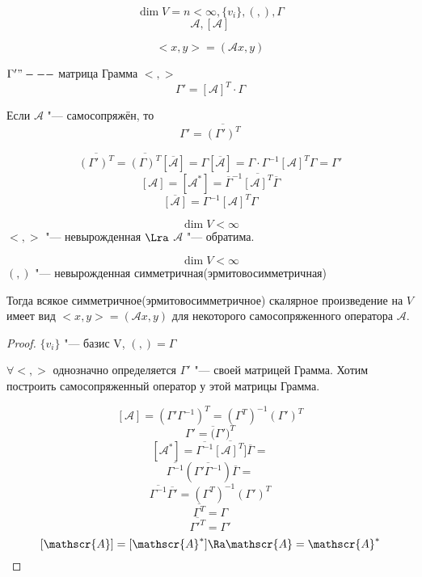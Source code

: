 \begin{exmp}
$$\dim V = n < \infty, \{v_i\}, (,), \Gamma$$
$$\mathscr{A}, [\mathscr{A}]$$

$$<x, y> = (\mathscr{A}x, y)$$

$\Gamma' "---$ матрица Грамма $<, >$
$$\Gamma' = [\mathscr{A}]^{T}\cdot \Gamma$$

Если $\mathscr{A}$ "--- самосопряжён, то
$$\Gamma' = \overline{(\Gamma')^{T}} $$

$$\overline{(\Gamma')^{T}} = \overline{(\Gamma)^{T}}[\overline{\mathscr{A}}] = \Gamma[\overline{\mathscr{A}}] = \Gamma \cdot \Gamma^{-1}[\mathscr{A}]^{T}\Gamma = \Gamma'$$
$$[\mathscr{A}] = [\mathscr{A}^*] = \overline{\Gamma}^{-1} \overline{[\mathscr{A}]^{T}} \overline{\Gamma}$$
$$\overline{[\mathscr{A}]} = \Gamma^{-1}[\mathscr{A}]^{T}\Gamma $$
\end{exmp}

\begin{conseq}{}
$$ \dim V < \infty$$
$<,>$ "--- невырожденная $\Lra$ $\mathscr{A}$ "--- обратима. 
\end{conseq}

\begin{conseq}{}
$$\dim V < \infty $$
$(,)$ "--- невырожденная симметричная(эрмитовосимметричная)

Тогда всякое симметричное(эрмитовосимметричное) скалярное произведение на $V$ имеет вид
$<x, y> = (\mathscr{A}x, y) $ для некоторого самосопряженного оператора $\mathscr{A}$.

\end{conseq}
\begin{proof}
$\{v_i\}$ "--- базис V, $(,) = \Gamma$

$\forall <, >$ однозначно определяется $\Gamma'$ "--- своей матрицей Грамма. Хотим построить самосопряженный оператор у этой матрицы Грамма.  

$$[\mathscr{A}] = (\Gamma' \Gamma^{-1})^{T} = (\Gamma^{T})^{-1}(\Gamma')^{T}$$
$$\Gamma' = \overline(\Gamma')^{T}$$
$$[\mathscr{A}^{*}] = \overline{\Gamma^{-1}} \overline{[\mathscr{A}]^{T}]} \overline{\Gamma} = $$
$$ \overline{\Gamma^{-1}}(\overline{\Gamma' \Gamma^{-1}}) \overline{\Gamma} = $$
$$ \overline{\Gamma^{-1}}\overline{\Gamma'}  = (\Gamma^{T})^{-1}(\Gamma')^{T}$$
$$\overline{\Gamma^{T}} = \Gamma$$
$$\overline{\Gamma'^{T}} = \Gamma'$$
$$[\mathscr{A}] = [\mathscr{A}^{*}] \Ra \mathscr{A} = \mathscr{A}^{*}$$
\end{proof}
